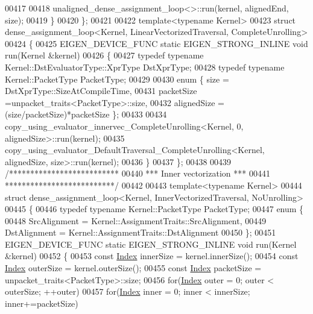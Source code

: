 \begin{DoxyCode}
00417 
00418     unaligned\_dense\_assignment\_loop<>::run(kernel, alignedEnd, size);
00419   \}
00420 \};
00421 
00422 \textcolor{keyword}{template}<\textcolor{keyword}{typename} Kernel>
00423 \textcolor{keyword}{struct }dense\_assignment\_loop<Kernel, LinearVectorizedTraversal, CompleteUnrolling>
00424 \{
00425   EIGEN\_DEVICE\_FUNC \textcolor{keyword}{static} EIGEN\_STRONG\_INLINE \textcolor{keywordtype}{void} run(Kernel &kernel)
00426   \{
00427     \textcolor{keyword}{typedef} \textcolor{keyword}{typename} Kernel::DstEvaluatorType::XprType DstXprType;
00428     \textcolor{keyword}{typedef} \textcolor{keyword}{typename} Kernel::PacketType PacketType;
00429     
00430     \textcolor{keyword}{enum} \{ size = DstXprType::SizeAtCompileTime,
00431            packetSize =unpacket\_traits<PacketType>::size,
00432            alignedSize = (size/packetSize)*packetSize \};
00433 
00434     copy\_using\_evaluator\_innervec\_CompleteUnrolling<Kernel, 0, alignedSize>::run(kernel);
00435     copy\_using\_evaluator\_DefaultTraversal\_CompleteUnrolling<Kernel, alignedSize, size>::run(kernel);
00436   \}
00437 \};
00438 
00439 \textcolor{comment}{/**************************}
00440 \textcolor{comment}{*** Inner vectorization ***}
00441 \textcolor{comment}{**************************/}
00442 
00443 \textcolor{keyword}{template}<\textcolor{keyword}{typename} Kernel>
00444 \textcolor{keyword}{struct }dense\_assignment\_loop<Kernel, InnerVectorizedTraversal, NoUnrolling>
00445 \{
00446   \textcolor{keyword}{typedef} \textcolor{keyword}{typename} Kernel::PacketType PacketType;
00447   \textcolor{keyword}{enum} \{
00448     SrcAlignment = Kernel::AssignmentTraits::SrcAlignment,
00449     DstAlignment = Kernel::AssignmentTraits::DstAlignment
00450   \};
00451   EIGEN\_DEVICE\_FUNC \textcolor{keyword}{static} EIGEN\_STRONG\_INLINE \textcolor{keywordtype}{void} run(Kernel &kernel)
00452   \{
00453     \textcolor{keyword}{const} \hyperlink{namespace_eigen_a62e77e0933482dafde8fe197d9a2cfde}{Index} innerSize = kernel.innerSize();
00454     \textcolor{keyword}{const} \hyperlink{namespace_eigen_a62e77e0933482dafde8fe197d9a2cfde}{Index} outerSize = kernel.outerSize();
00455     \textcolor{keyword}{const} \hyperlink{namespace_eigen_a62e77e0933482dafde8fe197d9a2cfde}{Index} packetSize = unpacket\_traits<PacketType>::size;
00456     \textcolor{keywordflow}{for}(\hyperlink{namespace_eigen_a62e77e0933482dafde8fe197d9a2cfde}{Index} outer = 0; outer < outerSize; ++outer)
00457       \textcolor{keywordflow}{for}(\hyperlink{namespace_eigen_a62e77e0933482dafde8fe197d9a2cfde}{Index} inner = 0; inner < innerSize; inner+=packetSize)

\end{DoxyCode}
